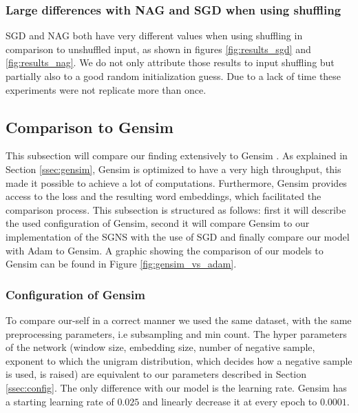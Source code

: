 \subsubsection{Large differences with NAG and SGD when using shuffling}
SGD and NAG both have very different values when using shuffling in comparison to unshuffled input, as shown in figures \ref{fig:results_sgd} and \ref{fig:results_nag}. We do not only attribute those results to input shuffling but partially also to a good random initialization guess. Due to a lack of time these experiments were not replicate more than once.

\subsection{Comparison to Gensim}
This subsection will compare our finding extensively to Gensim \citep{gensim}. As explained in Section \ref{ssec:gensim}, Gensim is optimized to have a very high throughput, this made it possible to achieve a lot of computations. Furthermore, Gensim provides access to the loss and the resulting word embeddings, which facilitated the comparison process.
This subsection is structured as follows: first it will describe the used configuration of Gensim, second it will compare Gensim to our implementation of the SGNS with the use of SGD and finally compare our model with Adam to Gensim. A graphic showing the comparison of our models to Gensim can be found in Figure \ref{fig:gensim_vs_adam}.


\subsubsection{Configuration of Gensim}
To compare our-self in a correct  manner we used the same dataset, with the same preprocessing parameters, i.e subsampling and min count. The hyper parameters of the network (window size, embedding size, number of negative sample, exponent to which the unigram distribution, which decides how a negative sample is used, is raised) are equivalent to our parameters described in Section \ref{ssec:config}. The only difference with our model is the learning rate. Gensim has a starting learning rate of $0.025$ and linearly decrease it at every epoch to $0.0001$.

